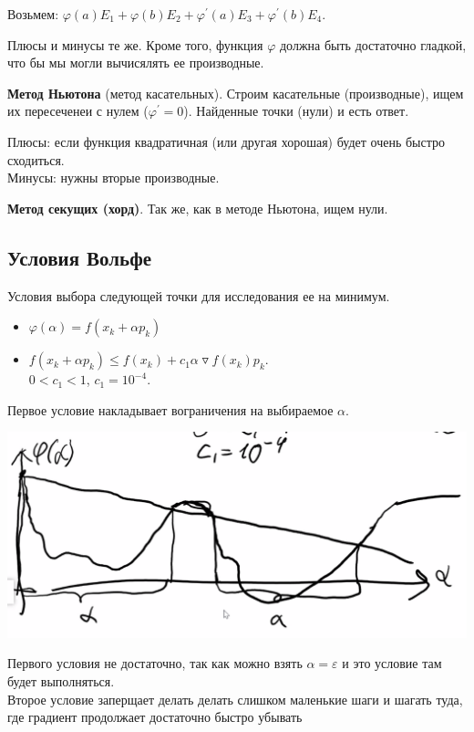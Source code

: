 Возьмем:
$\varphi(a) E_1 + \varphi (b) E_2 + \varphi^\prime (a) E_3 + \varphi^\prime (b) E_4$.

Плюсы и минусы те же.
Кроме того, функция $\varphi$ должна быть достаточно гладкой, что бы мы могли вычисялять ее производные.

\textbf{Метод Ньютона} (метод касательных).
Строим касательные (производные), ищем их пересеченеи с нулем ($\varphi^\prime = 0$).
Найденные точки (нули) и есть ответ.

Плюсы: если функция квадратичная (или другая хорошая) будет очень быстро сходиться.\\
Минусы: нужны вторые производные.

\textbf{Метод секущих (хорд)}.
Так же, как в методе Ньютона, ищем нули.

\subsection{Условия Вольфе}

Условия выбора следующей точки для исследования ее на минимум.

\begin{itemize}
    \item $\varphi (\alpha) = f(x_k + \alpha p_k)$
    \item $f(x_k + \alpha p_k) \leqslant f(x_k) + c_1 \alpha \triangledown f (x_k) p_k$.\\
    $0 < c_1 < 1$, $c_1 = 10^{-4}$.
\end{itemize}

Первое условие накладывает вограничения на выбираемое $\alpha$.
\begin{center}
    \includegraphics[scale=0.4]{img/methopt_volfe_conditions_1}
\end{center}

Первого условия не достаточно, так как можно взять $\alpha = \varepsilon$ и это условие там будет выполняться. \\
Второе условие заперщает делать делать слишком маленькие шаги и шагать туда, где градиент продолжает достаточно быстро убывать

